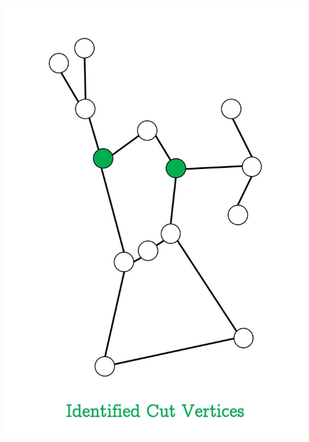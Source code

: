 \documentclass[unknownkeysallowed]{beamer}
\begin{document}
\begin{frame}
\centering\includegraphics[height=0.9\textheight]{assets/eg-cutvertex/1}
\end{frame}

\end{document}

